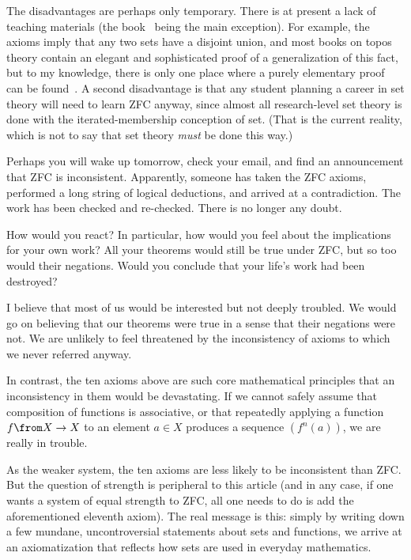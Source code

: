 \documentclass[12pt]{article}
\begin{document}
The disadvantages are perhaps only temporary.  There is at present a lack
of teaching materials (the book~\cite{LaRo} being the main exception).  For
example, the axioms imply that any two sets have a disjoint union, and
most books on topos theory contain an elegant and sophisticated proof of a
generalization of this fact, but to my knowledge, there is only one place where
a purely elementary proof can be found~\cite{TrimETCS3}.  A second
disadvantage is that any student planning a career in set theory will need
to learn ZFC anyway, since almost all research-level set theory is done
with the iterated-membership conception of set.  (That is the current
reality, which is not to say that set theory \emph{must} be done this way.)


Perhaps you will wake up tomorrow, check your email, and find an
announcement that ZFC is inconsistent.  Apparently, someone has taken the
ZFC axioms, performed a long string of logical deductions, and arrived at a
contradiction.  The work has been checked and re-checked.  There is no
longer any doubt.

How would you react?  In particular, how would you feel about the
implications for your own work?  All your theorems would still be true
under ZFC, but so too would their negations.  Would you conclude that your
life's work had been destroyed?

I believe that most of us would be interested but not deeply troubled.
We would go on believing that our theorems were true in a sense that their
negations were not.  We are unlikely to feel threatened by the
inconsistency of axioms to which we never referred anyway.

In contrast, the ten axioms above are such core mathematical principles
that an inconsistency in them would be devastating.  If we cannot safely
assume that composition of functions is associative, or that repeatedly
applying a function $f\from X \to X$ to an element $a \in X$ produces a
sequence $(f^n(a))$, we are really in trouble.

As the weaker system, the ten axioms are less likely to be inconsistent
than ZFC.  But the question of strength is peripheral to this article (and
in any case, if one wants a system of equal strength to ZFC, all one needs
to do is add the aforementioned eleventh axiom).  The real message is this:
simply by writing down a few mundane, uncontroversial statements about sets
and functions, we arrive at an axiomatization that reflects how sets are
used in everyday mathematics.
\end{document}
